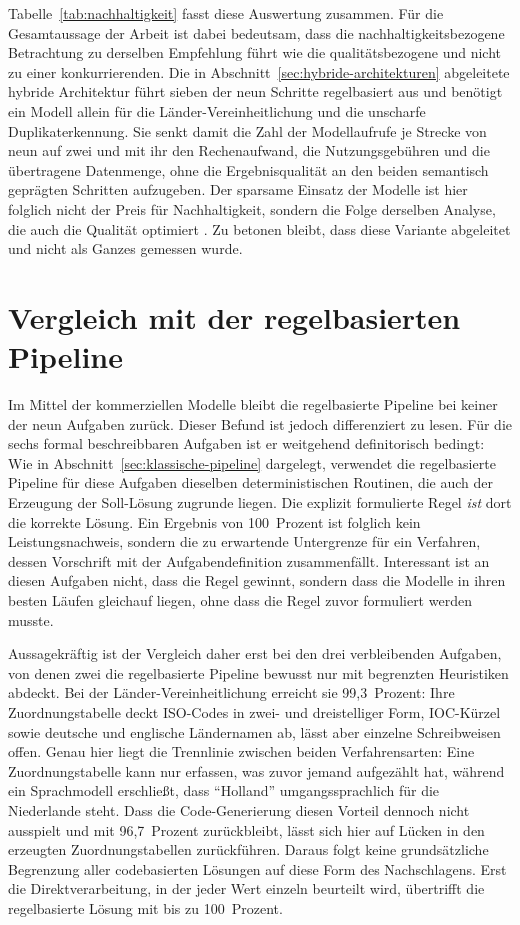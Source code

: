 Tabelle~\ref{tab:nachhaltigkeit} fasst diese Auswertung zusammen. Für die Gesamtaussage der Arbeit ist dabei bedeutsam, dass die nachhaltigkeitsbezogene Betrachtung zu derselben Empfehlung führt wie die qualitätsbezogene und nicht zu einer konkurrierenden. Die in Abschnitt~\ref{sec:hybride-architekturen} abgeleitete hybride Architektur führt sieben der neun Schritte regelbasiert aus und benötigt ein Modell allein für die Länder-Vereinheitlichung und die unscharfe Duplikaterkennung. Sie senkt damit die Zahl der Modellaufrufe je Strecke von neun auf zwei und mit ihr den Rechenaufwand, die Nutzungsgebühren und die übertragene Datenmenge, ohne die Ergebnisqualität an den beiden semantisch geprägten Schritten aufzugeben. Der sparsame Einsatz der Modelle ist hier folglich nicht der Preis für Nachhaltigkeit, sondern die Folge derselben Analyse, die auch die Qualität optimiert \autocite{walhaDataIntegrationTraditional2024,kasireddyRoleAIModern2026}. Zu betonen bleibt, dass diese Variante abgeleitet und nicht als Ganzes gemessen wurde.

\section{Vergleich mit der regelbasierten Pipeline}
\label{sec:vergleich-baseline}

Im Mittel der kommerziellen Modelle bleibt die regelbasierte Pipeline bei keiner der neun Aufgaben zurück. Dieser Befund ist jedoch differenziert zu lesen. Für die sechs formal beschreibbaren Aufgaben ist er weitgehend definitorisch bedingt: Wie in Abschnitt~\ref{sec:klassische-pipeline} dargelegt, verwendet die regelbasierte Pipeline für diese Aufgaben dieselben deterministischen Routinen, die auch der Erzeugung der Soll-Lösung zugrunde liegen. Die explizit formulierte Regel \emph{ist} dort die korrekte Lösung. Ein Ergebnis von 100~Prozent ist folglich kein Leistungsnachweis, sondern die zu erwartende Untergrenze für ein Verfahren, dessen Vorschrift mit der Aufgabendefinition zusammenfällt. Interessant ist an diesen Aufgaben nicht, dass die Regel gewinnt, sondern dass die Modelle in ihren besten Läufen gleichauf liegen, ohne dass die Regel zuvor formuliert werden musste.

Aussagekräftig ist der Vergleich daher erst bei den drei verbleibenden Aufgaben, von denen zwei die regelbasierte Pipeline bewusst nur mit begrenzten Heuristiken abdeckt. Bei der Länder-Vereinheitlichung erreicht sie 99,3~Prozent: Ihre Zuordnungstabelle deckt ISO-Codes in zwei- und dreistelliger Form, IOC-Kürzel sowie deutsche und englische Ländernamen ab, lässt aber einzelne Schreibweisen offen. Genau hier liegt die Trennlinie zwischen beiden Verfahrensarten: Eine Zuordnungstabelle kann nur erfassen, was zuvor jemand aufgezählt hat, während ein Sprachmodell erschließt, dass \enquote{Holland} umgangssprachlich für die Niederlande steht. Dass die Code-Generierung diesen Vorteil dennoch nicht ausspielt und mit 96,7~Prozent zurückbleibt, lässt sich hier auf Lücken in den erzeugten Zuordnungstabellen zurückführen. Daraus folgt keine grundsätzliche Begrenzung aller codebasierten Lösungen auf diese Form des Nachschlagens. Erst die Direktverarbeitung, in der jeder Wert einzeln beurteilt wird, übertrifft die regelbasierte Lösung mit bis zu 100~Prozent.

